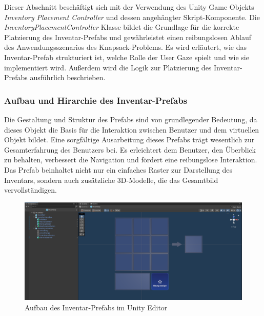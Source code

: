 Dieser Abschnitt beschäftigt sich mit der Verwendung des Unity Game Objekts \textit{Inventory Placement Controller} und
dessen angehängter Skript-Komponente. Die \textit{InventoryPlacementController} Klasse bildet die Grundlage für die korrekte
Platzierung des Inventar-Prefabs und gewährleistet einen reibungslosen Ablauf des Anwendungsszenarios des Knapsack-Problems.
Es wird erläutert, wie das Inventar-Prefab strukturiert ist, welche Rolle der User Gaze spielt und wie sie implementiert
wird. Außerdem wird die Logik zur Platzierung des Inventar-Prefabs ausführlich beschrieben.

\subsubsection{Aufbau und Hirarchie des Inventar-Prefabs}
Die Gestaltung und Struktur des Prefabs sind von grundlegender Bedeutung, da dieses Objekt die Basis für die Interaktion
zwischen Benutzer und dem virtuellen Objekt bildet. Eine sorgfältige Ausarbeitung dieses Prefabs trägt wesentlich zur
Gesamterfahrung des Benutzers bei. Es erleichtert dem Benutzer, den Überblick zu behalten, verbessert die Navigation und
fördert eine reibungslose Interaktion. Das Prefab beinhaltet nicht nur ein einfaches Raster zur Darstellung des Inventars,
sondern auch zusätzliche 3D-Modelle, die das Gesamtbild vervollständigen.

\begin{figure}[H]
    \centering
    \includegraphics[scale=0.3]{images/invPrefabUnity}
    \caption{Aufbau des Inventar-Prefabs im Unity Editor}
    \label{fig:invPrefab_UNITY}
\end{figure}

